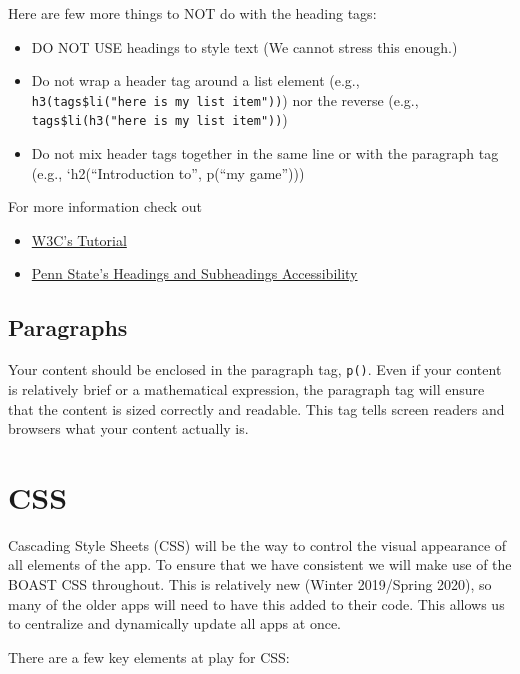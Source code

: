 \documentclass[
]{book}
\providecommand{\tightlist}{%
  \setlength{\itemsep}{0pt}\setlength{\parskip}{0pt}}
\begin{document}
Here are few more things to NOT do with the heading tags:

\begin{itemize}
\tightlist
\item
  DO NOT USE headings to style text (We cannot stress this enough.)
\item
  Do not wrap a header tag around a list element (e.g., \texttt{h3(tags\$li("here\ is\ my\ list\ item"))}) nor the reverse (e.g., \texttt{tags\$li(h3("here\ is\ my\ list\ item"))})
\item
  Do not mix header tags together in the same line or with the paragraph tag (e.g., `h2(``Introduction to'', p(``my game'')))
\end{itemize}

For more information check out

\begin{itemize}
\tightlist
\item
  \href{https://www.w3.org/WAI/tutorials/page-structure/headings/}{W3C's Tutorial}
\item
  \href{https://accessibility.psu.edu/headings/}{Penn State's Headings and Subheadings Accessibility}
\end{itemize}

\hypertarget{paragraphs}{%
\subsection{Paragraphs}\label{paragraphs}}

Your content should be enclosed in the paragraph tag, \texttt{p()}. Even if your content is relatively brief or a mathematical expression, the paragraph tag will ensure that the content is sized correctly and readable. This tag tells screen readers and browsers what your content actually is.

\hypertarget{css}{%
\section{CSS}\label{css}}

Cascading Style Sheets (CSS) will be the way to control the visual appearance of all elements of the app. To ensure that we have consistent we will make use of the BOAST CSS throughout. This is relatively new (Winter 2019/Spring 2020), so many of the older apps will need to have this added to their code. This allows us to centralize and dynamically update all apps at once.

There are a few key elements at play for CSS:
\end{document}
